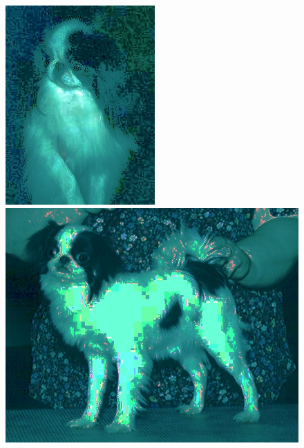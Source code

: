 \begin{appendices}
\begin{figure}[htb]
\begin{minipage}{0.19\textwidth}
\includegraphics[width=\textwidth]{images/anomalien/HS/n02085782_1503.jpg}
\end{minipage}
\begin{minipage}{0.19\textwidth}
\includegraphics[width=\textwidth]{images/anomalien/HS/n02085782_1626.jpg}

\end{minipage}
\end{figure}
\end{appendices}
